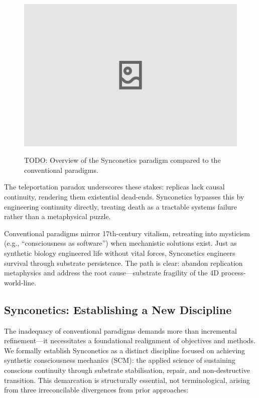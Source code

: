 \documentclass[10pt]{article}
\begin{document}
\begin{sloppypar}
  \begin{figure}[ht!]
    \centering
    \includegraphics[width=\textwidth]{figures/synconetics-paradigm.png}
    \label{fig:synconetics-paradigm}
    \caption{TODO: Overview of the Synconetics paradigm compared to the conventional paradigms.}
  \end{figure}

  The teleportation paradox underscores these stakes: replicas lack causal continuity, rendering them existential dead-ends. Synconetics bypasses this by engineering continuity directly, treating death as a tractable systems failure rather than a metaphysical puzzle.

  Conventional paradigms mirror 17th-century vitalism, retreating into mysticism (e.g., “consciousness as software”) when mechanistic solutions exist. Just as synthetic biology engineered life without vital forces, Synconetics engineers survival through substrate persistence. The path is clear: abandon replication metaphysics and address the root cause—substrate fragility of the 4D process-world-line.

  \subsection{Synconetics: Establishing a New Discipline}
  \label{sec:new-discipline}

  The inadequacy of conventional paradigms demands more than incremental refinement—it necessitates a foundational realignment of objectives and methods. We formally establish Synconetics as a distinct discipline focused on achieving synthetic consciousness mechanics (SCM): the applied science of sustaining conscious continuity through substrate stabilisation, repair, and non-destructive transition. This demarcation is structurally essential, not terminological, arising from three irreconcilable divergences from prior approaches:


\end{sloppypar}
\end{document}
